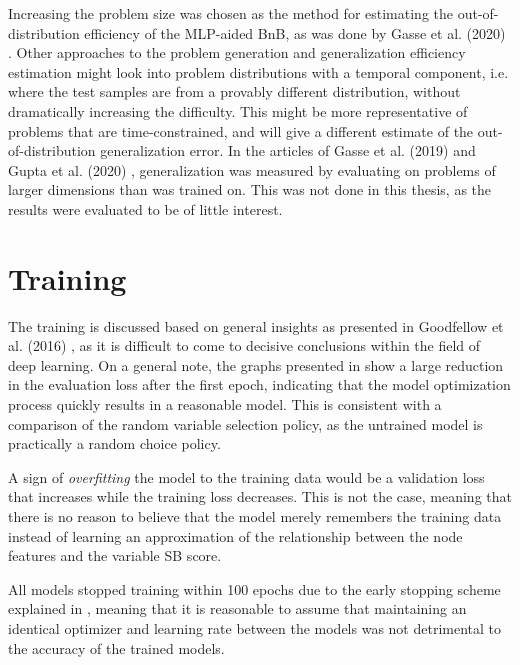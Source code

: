 Increasing the problem size was chosen as the method for estimating the out-of-distribution efficiency of the \gls{MLP}-aided \gls{BnB}, as was done by Gasse et al. (2020) \cite{gasse2019exact}. Other approaches to the problem generation and generalization efficiency estimation might look into problem distributions with a temporal component, i.e. where the test samples are from a provably different distribution, without dramatically increasing the difficulty. This might be more representative of problems that are time-constrained, and will give a different estimate of the out-of-distribution generalization error. In the articles of Gasse et al. (2019) \cite{gasse2019exact} and Gupta et al. (2020) \cite{gupta2020hybrid}, generalization was measured by evaluating on problems of larger dimensions than was trained on. This was not done in this thesis, as the results were evaluated to be of little interest. 




\section{Training}\label{sec:disc_training}

The training is discussed based on general insights as presented in Goodfellow et al. (2016) \cite{goodfellow2016deep}, as it is difficult to come to decisive conclusions within the field of deep learning. On a general note, the graphs presented in  show a large reduction in the evaluation loss after the first epoch, indicating that the model optimization process quickly results in a reasonable model. This is consistent with a comparison of the random variable selection policy, as the untrained model is practically a random choice policy.  

A sign of \textit{overfitting} the model to the training data would be a validation loss that increases while the training loss decreases. This is not the case, meaning that there is no reason to believe that the model merely remembers the training data instead of learning an approximation of the relationship between the node features and the variable \gls{SB} score. 

All models stopped training within 100 epochs due to the early stopping scheme explained in , meaning that it is reasonable to assume that maintaining an identical optimizer and learning rate between the models was not detrimental to the accuracy of the trained models.  




